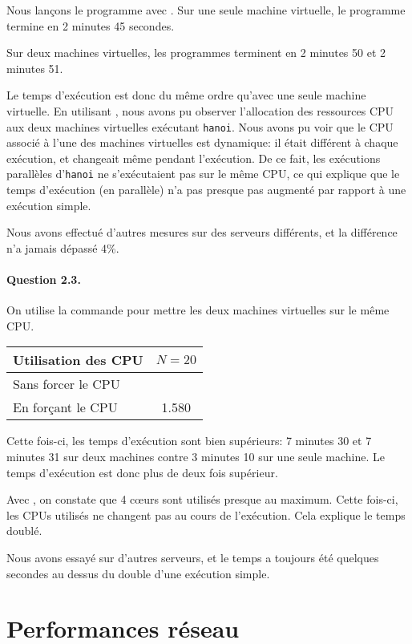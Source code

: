 \documentclass[12pt]{article}
\begin{document}
Nous lançons le programme  avec . Sur une seule machine virtuelle, le programme termine en 2 minutes 45 secondes.

Sur deux machines virtuelles, les programmes terminent en 2 minutes 50 et 2 minutes 51.


Le temps d'exécution est donc du même ordre qu'avec une seule machine virtuelle. En utilisant , nous avons pu observer l'allocation des ressources CPU aux deux machines virtuelles exécutant \texttt{hanoi}. Nous avons pu voir que le CPU associé à l'une des machines virtuelles est dynamique: il était différent à chaque exécution, et changeait même pendant l'exécution. De ce fait, les exécutions parallèles d'\texttt{hanoi} ne s'exécutaient pas sur le même CPU, ce qui explique que le temps d'exécution (en parallèle) n'a pas presque pas augmenté par rapport à une exécution simple.

Nous avons effectué d'autres mesures sur des serveurs différents, et la différence n'a jamais dépassé 4\%.


\paragraph{Question 2.3.}
On utilise la commande  pour mettre les deux machines virtuelles sur le même CPU.

\begin{tabular}{| l | c |}\hline
Utilisation des CPU & $N=20$ \\\hline
Sans forcer le CPU &  \\\hline
En forçant le CPU & 1.580 \\\hline
\end{tabular}


Cette fois-ci, les temps d'exécution sont bien supérieurs: 7 minutes 30 et 7 minutes 31 sur deux machines contre 3 minutes 10 sur une seule machine. Le temps d'exécution est donc plus de deux fois supérieur.

Avec , on constate que 4 c\oe urs sont utilisés presque au maximum. Cette fois-ci, les CPUs utilisés ne changent pas au cours de l'exécution. Cela explique le temps doublé.

Nous avons essayé sur d'autres serveurs, et le temps a toujours été quelques secondes au dessus du double d'une exécution simple.


\section{Performances réseau}
\end{document}
